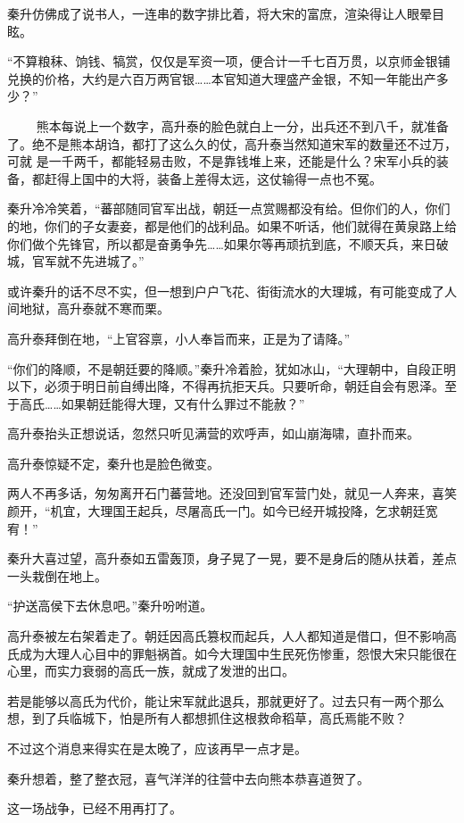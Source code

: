 秦升仿佛成了说书人，一连串的数字排比着，将大宋的富庶，渲染得让人眼晕目眩。

“不算粮秣、饷钱、犒赏，仅仅是军资一项，便合计一千七百万贯，以京师金银铺兑换的价格，大约是六百万两官银……本官知道大理盛产金银，不知一年能出产多少？”

　
　熊本每说上一个数字，高升泰的脸色就白上一分，出兵还不到八千，就准备了。绝不是熊本胡诌，都打了这么久的仗，高升泰当然知道宋军的数量还不过万，可就
是一千两千，都能轻易击败，不是靠钱堆上来，还能是什么？宋军小兵的装备，都赶得上国中的大将，装备上差得太远，这仗输得一点也不冤。

秦升冷冷笑着，“蕃部随同官军出战，朝廷一点赏赐都没有给。但你们的人，你们的地，你们的子女妻妾，都是他们的战利品。如果不听话，他们就得在黄泉路上给你们做个先锋官，所以都是奋勇争先……如果尔等再顽抗到底，不顺天兵，来日破城，官军就不先进城了。”

或许秦升的话不尽不实，但一想到户户飞花、街街流水的大理城，有可能变成了人间地狱，高升泰就不寒而栗。

高升泰拜倒在地，“上官容禀，小人奉旨而来，正是为了请降。”

“你们的降顺，不是朝廷要的降顺。”秦升冷着脸，犹如冰山，“大理朝中，自段正明以下，必须于明日前自缚出降，不得再抗拒天兵。只要听命，朝廷自会有恩泽。至于高氏……如果朝廷能得大理，又有什么罪过不能赦？”

高升泰抬头正想说话，忽然只听见满营的欢呼声，如山崩海啸，直扑而来。

高升泰惊疑不定，秦升也是脸色微变。

两人不再多话，匆匆离开石门蕃营地。还没回到官军营门处，就见一人奔来，喜笑颜开，“机宜，大理国王起兵，尽屠高氏一门。如今已经开城投降，乞求朝廷宽宥！”

秦升大喜过望，高升泰如五雷轰顶，身子晃了一晃，要不是身后的随从扶着，差点一头栽倒在地上。

“护送高侯下去休息吧。”秦升吩咐道。

高升泰被左右架着走了。朝廷因高氏篡权而起兵，人人都知道是借口，但不影响高氏成为大理人心目中的罪魁祸首。如今大理国中生民死伤惨重，怨恨大宋只能很在心里，而实力衰弱的高氏一族，就成了发泄的出口。

若是能够以高氏为代价，能让宋军就此退兵，那就更好了。过去只有一两个那么想，到了兵临城下，怕是所有人都想抓住这根救命稻草，高氏焉能不败？

不过这个消息来得实在是太晚了，应该再早一点才是。

秦升想着，整了整衣冠，喜气洋洋的往营中去向熊本恭喜道贺了。

这一场战争，已经不用再打了。

